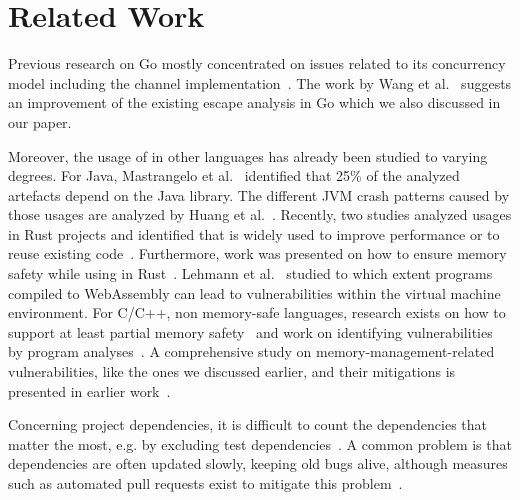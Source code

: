 \section{Related Work}
\label{sec:rw}

Previous research on Go mostly concentrated on issues related to its concurrency model including the channel implementation~\cite{tu2019,dilley2019,giunti2020,gabet2020,lange2017,bodden2016information}.
The work by Wang et al.~\cite{wang2020} suggests an improvement of the existing escape analysis in Go which we also discussed in our paper. 


Moreover, the usage of \unsafe{} in other languages has already been studied to varying degrees. 
For Java, Mastrangelo et al.~\cite{mastrangelo2015} identified that 25\% of the analyzed artefacts depend on the Java \unsafe{} library.
The different JVM crash patterns caused by those usages are analyzed by Huang et al.~\cite{huang2019}.
Recently, two studies analyzed \unsafe{} usages in Rust projects and identified that \unsafe{} is widely used to improve performance or to reuse existing code~\cite{qin2020,evans2020}.
Furthermore, work was presented on how to ensure memory safety while using \unsafe{} in Rust~\cite{hussain2018Fidelius}.
Lehmann et al.~\cite{lehmann-everything-2020} studied to which extent \unsafe{} programs compiled to WebAssembly can lead to vulnerabilities within the virtual machine environment. %
%
%
For C/C++, non memory-safe languages, research exists on how to support at least partial memory safety~\cite{burow2018CUP, nagarkatte2009SoftBound} and work on identifying vulnerabilities by program analyses~\cite{song2019sok}.
A comprehensive study on memory-management-related vulnerabilities, like the ones we discussed earlier, and their mitigations is presented in earlier work~\cite{szekeres2013sok}.

Concerning project dependencies, it is difficult to count the dependencies that matter the most, e.g. by excluding test dependencies~\cite{pashchenko2018}.
A common problem is that dependencies are often updated slowly, keeping old bugs alive, although measures such as automated pull requests exist to mitigate this problem~\cite{derr2017keep, mirhosseini2017, lauinger2017}.



